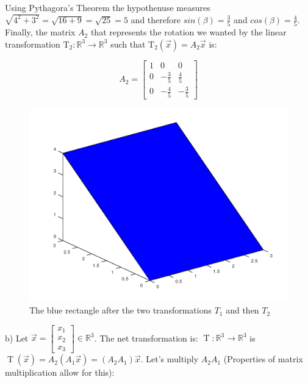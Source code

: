 \documentclass[12pt, letterpaper]{article}
\newcommand{\R}{\mathbb{R}}
\theoremstyle{statement}
\theoremstyle{statement}
\begin{document}
    Using Pythagora's Theorem the hypothenuse measures $\sqrt{4^2+3^2}=\sqrt{16+9}=\sqrt{25}=5$ and therefore $sin(\beta) = \frac{3}{5}$ and $cos(\beta) = \frac{4}{5}$. Finally, the matrix $A_2$ that represents the rotation we wanted by the linear transformation $\operatorname{T_2}:\R^3\longrightarrow\R^3$ such that $\operatorname{T_2}(\Vec{x})=A_2\Vec{x}$ is:
    
    $$
    A_2=
    \begin{bmatrix}
    1 & 0 & 0\\
    0 & -\frac{3}{5}& \frac{4}{5} \\
    0 & -\frac{4}{5} & -\frac{3}{5} 
    \end{bmatrix}
    $$
    
    \begin{figure}[H]
        \centering
        \includegraphics[scale=0.5]{boxfin.png}
        \caption{The blue rectangle after the two transformations $T_1$ and then $T_2$}
        \label{fig:finalTransformed}
    \end{figure}
    
    b) Let $\Vec{x}=\begin{bmatrix} x_1 \\ x_2 \\ x_3\end{bmatrix}\in\R^3$. The net transformation is: $\operatorname{T}:\R^3\longrightarrow\R^3$ is $\operatorname{T}(\Vec{x})=A_2(A_1\Vec{x})=(A_2A_1)\Vec{x}$. Let's multiply $A_2A_1$ (Properties of matrix multiplication allow for this):
    
\end{document}
